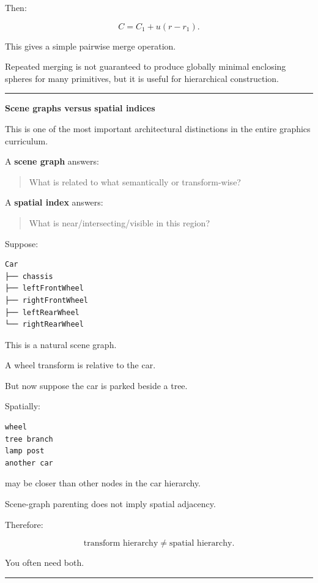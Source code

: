 Then:

\[
\boxed{
C=C_1+u(r-r_1).
}
\]

This gives a simple pairwise merge operation.

Repeated merging is not guaranteed to produce globally minimal enclosing spheres for many primitives, but it is useful for hierarchical construction.

\begin{center}\rule{0.5\linewidth}{0.5pt}\end{center}

\textbf{Scene graphs versus spatial indices}

This is one of the most important architectural distinctions in the entire graphics curriculum.

A \textbf{scene graph} answers:

\begin{quote}
What is related to what semantically or transform-wise?
\end{quote}

A \textbf{spatial index} answers:

\begin{quote}
What is near/intersecting/visible in this region?
\end{quote}

Suppose:

\begin{verbatim}
Car
├── chassis
├── leftFrontWheel
├── rightFrontWheel
├── leftRearWheel
└── rightRearWheel
\end{verbatim}

This is a natural scene graph.

A wheel transform is relative to the car.

But now suppose the car is parked beside a tree.

Spatially:

\begin{verbatim}
wheel
tree branch
lamp post
another car
\end{verbatim}

may be closer than other nodes in the car hierarchy.

Scene-graph parenting does not imply spatial adjacency.

Therefore:

\[
\boxed{
\text{transform hierarchy}
\neq
\text{spatial hierarchy}.
}
\]

You often need both.

\begin{center}\rule{0.5\linewidth}{0.5pt}\end{center}

